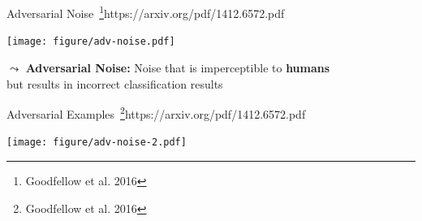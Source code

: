 \documentclass[11pt,compress,t,notes=noshow, xcolor=table]{beamer}
\begin{document}
	
\begin{vbframe}{Adversarial Noise~\footnote{Goodfellow et al. 2016}{https://arxiv.org/pdf/1412.6572.pdf}}
    
    \centering
    \texttt{[image: figure/adv-noise.pdf]}
	
	$\leadsto$ \textbf{Adversarial Noise:} Noise that is imperceptible to \textbf{humans}\\ but results in incorrect classification results
	
\end{vbframe}

\begin{vbframe}{Adversarial Examples~\footnote{Goodfellow et al. 2016}{https://arxiv.org/pdf/1412.6572.pdf}}
    
    \centering
    \texttt{[image: figure/adv-noise-2.pdf]}
	
\end{vbframe}


\endlecture
\end{document}
